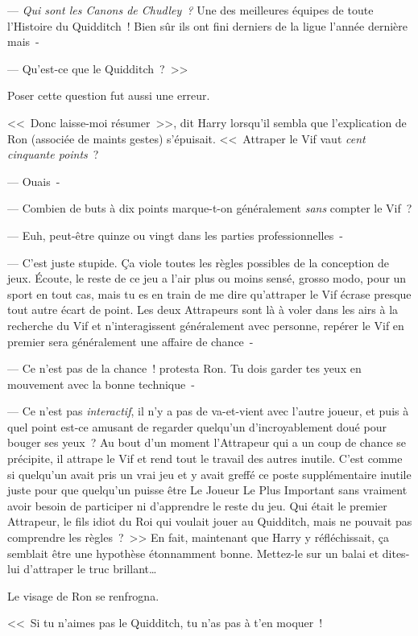 --- \emph{Qui sont les Canons de Chudley~?} Une des meilleures équipes de toute l'Histoire du Quidditch~! Bien sûr ils ont fini derniers de la ligue l'année dernière mais~-

--- Qu'est-ce que le Quidditch~?~>>

Poser cette question fut aussi une erreur.

<<~Donc laisse-moi résumer~>>, dit Harry lorsqu'il sembla que l'explication de Ron (associée de maints gestes) s'épuisait. <<~Attraper le Vif vaut \emph{cent cinquante points}~?

--- Ouais~-

--- Combien de buts à dix points marque-t-on généralement \emph{sans} compter le Vif~?

--- Euh, peut-être quinze ou vingt dans les parties professionnelles~-

--- C'est juste stupide. Ça viole toutes les règles possibles de la conception de jeux. Écoute, le reste de ce jeu a l'air plus ou moins sensé, grosso modo, pour un sport en tout cas, mais tu es en train de me dire qu'attraper le Vif écrase presque tout autre écart de point. Les deux Attrapeurs sont là à voler dans les airs à la recherche du Vif et n'interagissent généralement avec personne, repérer le Vif en premier sera généralement une affaire de chance~-

--- Ce n'est pas de la chance~! protesta Ron. Tu dois garder tes yeux en mouvement avec la bonne technique~-

--- Ce n'est pas \emph{interactif}, il n'y a pas de va-et-vient avec l'autre joueur, et puis à quel point est-ce amusant de regarder quelqu'un d'incroyablement doué pour bouger ses yeux~? Au bout d'un moment l'Attrapeur qui a un coup de chance se précipite, il attrape le Vif et rend tout le travail des autres inutile. C'est comme si quelqu'un avait pris un vrai jeu et y avait greffé ce poste supplémentaire inutile juste pour que quelqu'un puisse être Le Joueur Le Plus Important sans vraiment avoir besoin de participer ni d'apprendre le reste du jeu. Qui était le premier Attrapeur, le fils idiot du Roi qui voulait jouer au Quidditch, mais ne pouvait pas comprendre les règles~?~>> En fait, maintenant que Harry y réfléchissait, ça semblait être une hypothèse étonnamment bonne. Mettez-le sur un balai et dites-lui d'attraper le truc brillant…

Le visage de Ron se renfrogna. 

<<~Si tu n'aimes pas le Quidditch, tu n'as pas à t'en moquer~!

